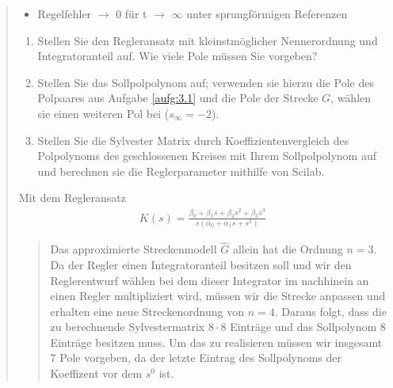 \begin{quote}
\begin{itemize}
            \item Regelfehler $\to$ 0 für t $\to$ $\infty$ unter sprungförmigen Referenzen
        
        \end{itemize}
        \vspace{1em}
        
        \begin{enumerate}
            
            \item Stellen Sie den Regleransatz mit kleinstmöglicher Nennerordnung und Integratoranteil auf. Wie viele Pole
            müssen Sie vorgeben?
            
            \item Stellen Sie das Sollpolpolynom auf; verwenden sie hierzu die Pole des Polpaares aus Aufgabe \ref{aufg:3.1}
            und die Pole der Strecke $G$, wählen sie einen weiteren Pol bei ($s_\infty = -2$).
            
            \item Stellen Sie die Sylvester Matrix durch Koeffizientenvergleich des Polpolynoms des geschlossenen Kreises
            mit Ihrem Sollpolpolynom auf und berechnen sie die Reglerparameter mithilfe von Scilab.
        
        \end{enumerate}\vspace{1em}
       
        Mit dem Regleransatz\\
        
        \begin{equation*}
            \begin{split}
                K(s) = \frac{\beta_0 + \beta_1 s + \beta_2 s^2 + \beta_3 s^3}{s(\alpha_0 + \alpha_1 s + s^2)}
            \end{split}
        \end{equation*}\vspace{1em}
        
    \begin{quote}
      
        Das approximierte Streckenmodell $\hat{G}$ allein hat die Ordnung $n = 3$. Da der Regler einen
        Integratoranteil besitzen soll und wir den Reglerentwurf wählen bei dem dieser Integrator im nachhinein
        an einen Regler multipliziert wird, müssen wir die Strecke anpassen und erhalten eine neue Streckenordnung von
        $n = 4$. Daraus folgt, dass die zu berechnende Sylvestermatrix $8\cdot 8$ Einträge und das Sollpolynom 8
        Einträge besitzen muss. Um das zu realisieren müssen wir insgesamt 7 Pole vorgeben, da der letzte Eintrag des
        Sollpolynoms der Koeffizent vor dem $s^0$ ist.\\
        

\end{quote}
\end{quote}
